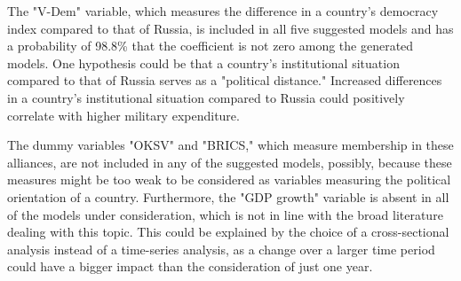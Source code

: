 \documentclass[12pt,a4paper]{article}
\begin{document}
The "V-Dem" variable, which measures the difference in a country's democracy index compared to that of Russia, is included in all five suggested models and has a probability of 98.8\% that the coefficient is not zero among the generated models. One hypothesis could be that a country's institutional situation compared to that of Russia serves as a "political distance." Increased differences in a country's institutional situation compared to Russia could positively correlate with higher military expenditure.

The dummy variables "OKSV" and "BRICS," which measure membership in these alliances, are not included in any of the suggested models, possibly, because these measures might be too weak to be considered as variables measuring the political orientation of a country. Furthermore, the "GDP growth" variable is absent in all of the models under consideration, which is not in line with the broad literature dealing with this topic. This could be explained by the choice of a cross-sectional analysis instead of a time-series analysis, as a change over a larger time period could have a bigger impact than the consideration of just one year.  \\
\end{document}
